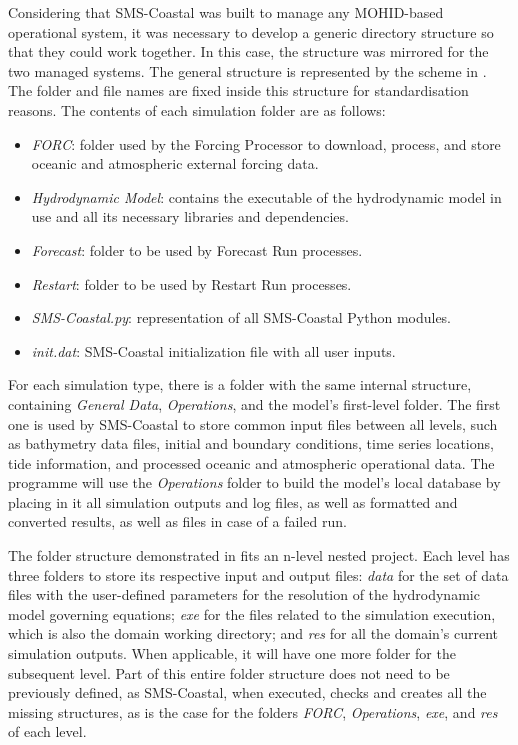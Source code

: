 Considering that SMS-Coastal was built to manage any MOHID-based operational system, it was necessary to develop a generic directory structure so that they could work together. In this case, the structure was mirrored for the two managed systems. The general structure is represented by the scheme in . The folder and file names are fixed inside this structure for standardisation reasons. The contents of each simulation folder are as follows:

\begin{itemize}
    \item \emph{FORC}: folder used by the Forcing Processor to download, process, and store oceanic and atmospheric external forcing data.
	\item \emph{Hydrodynamic Model}: contains the executable of the hydrodynamic model in use and all its necessary libraries and dependencies.
	\item \emph{Forecast}: folder to be used by Forecast Run processes.
	\item \emph{Restart}: folder to be used by Restart Run processes.
	\item \emph{SMS-Coastal.py}: representation of all SMS-Coastal Python modules.
	\item \emph{init.dat}: SMS-Coastal initialization file with all user inputs.
\end{itemize}

For each simulation type, there is a folder with the same internal structure, containing \emph{General Data}, \emph{Operations}, and the model's first-level folder. The first one is used by SMS-Coastal to store common input files between all levels, such as bathymetry data files, initial and boundary conditions, time series locations, tide information, and processed oceanic and atmospheric operational data. The programme will use the \emph{Operations} folder to build the model's local database by placing in it all simulation outputs and log files, as well as formatted and converted results, as well as files in case of a failed run.

The folder structure demonstrated in  fits an n-level nested project. Each level has three folders to store its respective input and output files: \emph{data} for the set of data files with the user-defined parameters for the resolution of the hydrodynamic model governing equations; \emph{exe} for the files related to the simulation execution, which is also the domain working directory; and \emph{res} for all the domain's current simulation outputs. When applicable, it will have one more folder for the subsequent level. Part of this entire folder structure does not need to be previously defined, as SMS-Coastal, when executed, checks and creates all the missing structures, as is the case for the folders \emph{FORC}, \emph{Operations}, \emph{exe}, and \emph{res} of each level.

